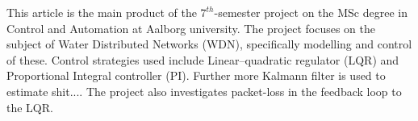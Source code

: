 This article is the main product of the $ 7^{th} $-semester project on the MSc degree in Control and Automation at Aalborg university. The project focuses on the subject of Water Distributed Networks (WDN), specifically modelling and control of these. Control strategies used include Linear–quadratic regulator (LQR) and Proportional Integral controller (PI). Further more Kalmann filter is used to estimate shit.... The project also investigates packet-loss in the feedback loop to the LQR. 